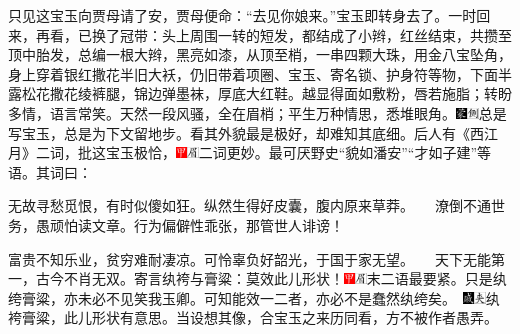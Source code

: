 只见这宝玉向贾母请了安，贾母便命：``去见你娘来。''宝玉即转身去了。一时回来，再看，已换了冠带：头上周围一转的短发，都结成了小辫，红丝结束，共攒至顶中胎发，总编一根大辫，黑亮如漆，从顶至梢，一串四颗大珠，用金八宝坠角，身上穿着银红撒花半旧大袄，仍旧带着项圈、宝玉、寄名锁、护身符等物，下面半露松花撒花绫裤腿，锦边弹墨袜，厚底大红鞋。越显得面如敷粉，唇若施脂；转盼多情，语言常笑。天然一段风骚，全在眉梢；平生万种情思，悉堆眼角。{\includegraphics[width=3mm]{../Images/00006}\includegraphics[width=3mm]{../Images/00011}\footnotesize \kaishu 总是写宝玉，总是为下文留地步。}看其外貌最是极好，却难知其底细。后人有《西江月》二词，批这宝玉极恰，{\includegraphics[width=3mm]{../Images/00002}\includegraphics[width=3mm]{../Images/00010}\footnotesize \kaishu 二词更妙。最可厌野史``貌如潘安''``才如子建''等语。}其词曰：

无故寻愁觅恨，有时似傻如狂。纵然生得好皮囊，腹内原来草莽。　　潦倒不通世务，愚顽怕读文章。行为偏僻性乖张，那管世人诽谤！

富贵不知乐业，贫穷难耐凄凉。可怜辜负好韶光，于国于家无望。　　天下无能第一，古今不肖无双。寄言纨袴与膏粱：莫效此儿形状！{{\includegraphics[width=3mm]{../Images/00002}\includegraphics[width=3mm]{../Images/00010}\footnotesize \kaishu 末二语最要紧。只是纨绔膏粱，亦未必不见笑我玉卿。可知能效一二者，亦必不是蠢然纨绔矣。　}\includegraphics[width=3mm]{../Images/00005}\includegraphics[width=3mm]{../Images/00012}\footnotesize \kaishu 纨袴膏粱，此儿形状有意思。当设想其像，合宝玉之来历同看，方不被作者愚弄。}

